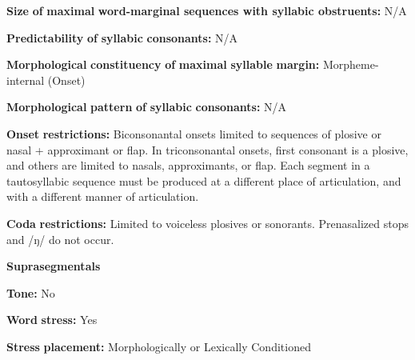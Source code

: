 \begin{styleBody}
\textbf{Size} \textbf{of} \textbf{maximal} \textbf{word{}-marginal sequences with syllabic obstruents:} N/A
\end{styleBody}

\begin{styleBody}
\textbf{Predictability} \textbf{of} \textbf{syllabic} \textbf{consonants:} N/A 
\end{styleBody}

\begin{styleBody}
\textbf{Morphological} \textbf{constituency} \textbf{of} \textbf{maximal} \textbf{syllable} \textbf{margin:} Morpheme-internal (Onset)
\end{styleBody}

\begin{styleBody}
\textbf{Morphological} \textbf{pattern} \textbf{of} \textbf{syllabic} \textbf{consonants:} N/A
\end{styleBody}

\begin{styleBody}
\textbf{Onset} \textbf{restrictions:} Biconsonantal onsets limited to sequences of plosive or nasal + approximant or flap. In triconsonantal onsets, first consonant is a plosive, and others are limited to nasals, approximants, or flap. Each segment in a tautosyllabic sequence must be produced at a different place of articulation, and with a different manner of articulation.
\end{styleBody}

\begin{styleBody}
\textbf{Coda} \textbf{restrictions:} Limited to voiceless plosives or sonorants. Prenasalized stops and /ŋ/ do not occur.
\end{styleBody}

\begin{styleBody}
\textbf{Suprasegmentals}
\end{styleBody}

\begin{styleBody}
\textbf{Tone:} No
\end{styleBody}

\begin{styleBody}
\textbf{Word} \textbf{stress:} Yes
\end{styleBody}

\begin{styleBody}
\textbf{Stress} \textbf{placement:} Morphologically or Lexically Conditioned
\end{styleBody}

